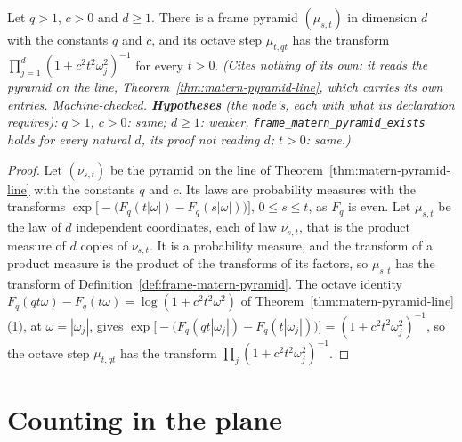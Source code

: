 \begin{proposition}
\label{prop:frame-matern-pyramid-exists}
\leanok
{}
Let $q > 1$, $c > 0$ and $d \ge 1$. There is a frame \Matern{} pyramid $(\mu_{s,t})$ in dimension
$d$ with the constants $q$ and $c$, and its octave step $\mu_{t,qt}$ has the transform
$\prod_{j=1}^d(1 + c^2t^2\omega_j^2)^{-1}$ for every $t > 0$.
\statusT\quad\emph{(Cites nothing of its own: it reads the \Matern{} pyramid on the line,
Theorem~\ref{thm:matern-pyramid-line}, which carries its own entries. Machine-checked.
\textbf{Hypotheses} (the node's, each with what its declaration requires): $q > 1$, $c > 0$: same;
$d \ge 1$: weaker, \texttt{frame\_matern\_pyramid\_exists} holds for every natural $d$, its proof
not reading $d$; $t > 0$: same.)}
\end{proposition}

\begin{proof}
\leanok
{}
Let $(\nu_{s,t})$ be the \Matern{} pyramid on the line of Theorem~\ref{thm:matern-pyramid-line}
with the constants $q$ and $c$. Its laws are probability measures with the transforms
$\exp\bigl[-\bigl(F_q(t|\omega|) - F_q(s|\omega|)\bigr)\bigr]$, $0 \le s \le t$, as $F_q$ is even.
Let $\mu_{s,t}$ be the law of $d$ independent coordinates, each of law $\nu_{s,t}$, that is the
product measure of $d$ copies of $\nu_{s,t}$. It is a probability measure, and the transform of a
product measure is the product of the transforms of its factors, so $\mu_{s,t}$ has the transform of
Definition~\ref{def:frame-matern-pyramid}. The octave identity
$F_q(qt\omega) - F_q(t\omega) = \log(1 + c^2t^2\omega^2)$ of
Theorem~\ref{thm:matern-pyramid-line}(1), at $\omega = |\omega_j|$, gives
$\exp\bigl[-\bigl(F_q(qt|\omega_j|) - F_q(t|\omega_j|)\bigr)\bigr] = (1 + c^2t^2\omega_j^2)^{-1}$,
so the octave step $\mu_{t,qt}$ has the transform $\prod_j(1 + c^2t^2\omega_j^2)^{-1}$.
\end{proof}

\section{Counting in the plane}
\label{sec:matern-counting}

